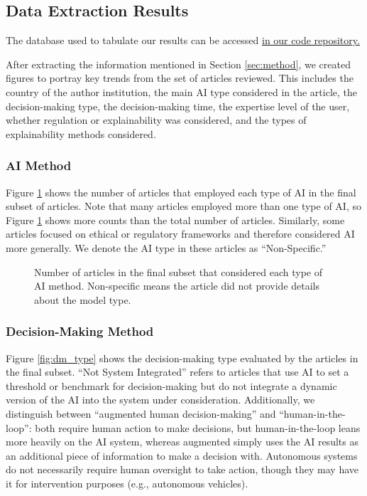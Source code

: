 \documentclass[authoryear,preprint,12pt]{elsarticle}
\begin{document}
\FloatBarrier

\subsection{Data Extraction Results}
The database used to tabulate our results can be accessed
\href{https://github.com/aims-umich/2025-panczyk-slr}{in our code repository.}

After extracting the information mentioned in Section \ref{sec:method}, we
created figures to portray key trends from the set of articles reviewed. This
includes the country of the author institution, the main AI type considered in
the article, the decision-making type, the decision-making time, the expertise
level of the user, whether regulation or explainability was considered, and the
types of explainability methods considered. 

\subsubsection{AI Method}
Figure \ref{fig:ai_type} shows the number of articles that employed each type of
AI in the final subset of articles. Note that many articles employed more than
one type of AI, so Figure \ref{fig:ai_type} shows more counts than the total
number of articles. Similarly, some articles focused on ethical or regulatory
frameworks and therefore considered AI more generally. We denote the AI type in
these articles as ``Non-Specific.''

\begin{figure}[ht!]
    \centering
    \resizebox{\textwidth}{!}{}
    \caption{Number of articles in the final subset that considered each type of AI method. Non-specific means the article did not provide details about the model type.}
    \label{fig:ai_type}
\end{figure}
\FloatBarrier

\subsubsection{Decision-Making Method}
Figure \ref{fig:dm_type} shows the decision-making type evaluated by the
articles in the final subset. ``Not System Integrated'' refers to articles that
use AI to set a threshold or benchmark for decision-making but do not integrate
a dynamic version of the AI into the system under consideration. Additionally,
we distinguish between ``augmented human decision-making'' and
``human-in-the-loop'': both require human action to make decisions, but
human-in-the-loop leans more heavily on the AI system, whereas augmented simply
uses the AI results as an additional piece of information to make a decision
with. Autonomous systems do not necessarily require human oversight to take
action, though they may have it for intervention purposes (e.g., autonomous
vehicles). 
\end{document}
